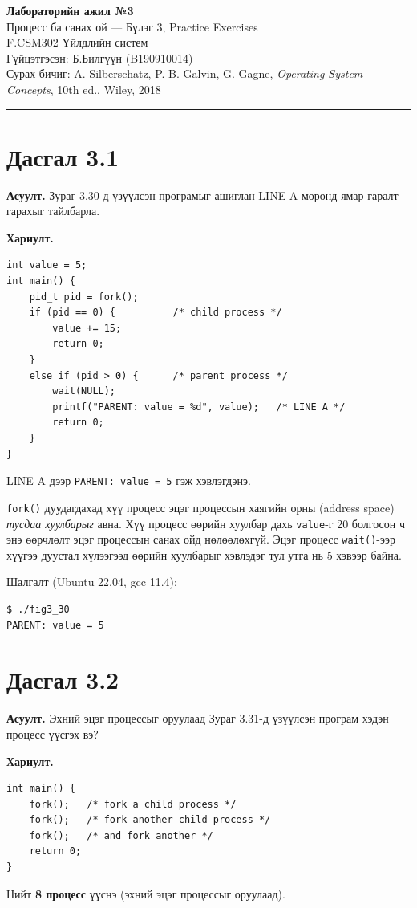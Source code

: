 \documentclass[12pt,a4paper]{article}
\newcommand{\question}[2]{\section{Дасгал #1}\textbf{Асуулт.} #2\par\medskip\textbf{Хариулт.}\par}
\begin{document}
\begin{center}
  {\Large\bfseries Лабораторийн ажил №3}\\[0.4em]
  {\large Процесс ба санах ой — Бүлэг 3, Practice Exercises}\\[0.8em]
  F.CSM302 Үйлдлийн систем\\
  Гүйцэтгэсэн: Б.Билгүүн (B190910014)\\[0.3em]
  Сурах бичиг: A. Silberschatz, P. B. Galvin, G. Gagne, \textit{Operating System Concepts}, 10th ed., Wiley, 2018
\end{center}
\hrule
\bigskip

\question{3.1}{Зураг 3.30-д үзүүлсэн програмыг ашиглан LINE A мөрөнд ямар гаралт гарахыг тайлбарла.}

\begin{lstlisting}
int value = 5;
int main() {
    pid_t pid = fork();
    if (pid == 0) {          /* child process */
        value += 15;
        return 0;
    }
    else if (pid > 0) {      /* parent process */
        wait(NULL);
        printf("PARENT: value = %d", value);   /* LINE A */
        return 0;
    }
}
\end{lstlisting}

LINE A дээр \texttt{PARENT: value = 5} гэж хэвлэгдэнэ.

\texttt{fork()} дуудагдахад хүү процесс эцэг процессын хаягийн орны (address space) \emph{тусдаа хуулбарыг} авна. Хүү процесс өөрийн хуулбар дахь \texttt{value}-г 20 болгосон ч энэ өөрчлөлт эцэг процессын санах ойд нөлөөлөхгүй. Эцэг процесс \texttt{wait()}-ээр хүүгээ дуустал хүлээгээд өөрийн хуулбарыг хэвлэдэг тул утга нь 5 хэвээр байна.

Шалгалт (Ubuntu 22.04, gcc 11.4):
\begin{lstlisting}[language=bash]
$ ./fig3_30
PARENT: value = 5
\end{lstlisting}

\question{3.2}{Эхний эцэг процессыг оруулаад Зураг 3.31-д үзүүлсэн програм хэдэн процесс үүсгэх вэ?}

\begin{lstlisting}
int main() {
    fork();   /* fork a child process */
    fork();   /* fork another child process */
    fork();   /* and fork another */
    return 0;
}
\end{lstlisting}

Нийт \textbf{8 процесс} үүснэ (эхний эцэг процессыг оруулаад).
\end{document}
